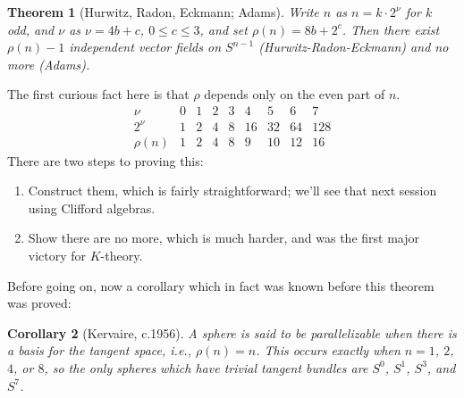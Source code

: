 \documentclass{article}
\newtheorem{thm}{Theorem}[section]
\newtheorem{cor}[thm]{Corollary}
\theoremstyle{definition}
\begin{document}
\begin{thm}[Hurwitz, Radon, Eckmann; Adams]
Write $n$ as $n = k \cdot 2^\nu$ for $k$ odd, and $\nu$ as $\nu = 4b + c$, $0 \le c \le 3$, and set $\rho(n) = 8b + 2^c$.  Then there exist $\rho(n) - 1$ independent vector fields on $S^{n-1}$ (Hurwitz-Radon-Eckmann) and no more (Adams).
\end{thm}
The first curious fact here is that $\rho$ depends only on the even part of $n$.
\[\begin{array}{c|cccccccc}
\nu & 0 & 1 & 2 & 3 & 4 & 5 & 6 & 7 \\
2^\nu & 1 & 2 & 4 & 8 & 16 & 32 & 64 & 128 \\
\hline
\rho(n) & 1 & 2 & 4 & 8 & 9 & 10 & 12 & 16
\end{array}\]
There are two steps to proving this:
\begin{enumerate} %
\item Construct them, which is fairly straightforward; we'll see that next session using Clifford algebras.
\item Show there are no more, which is much harder, and was the first major victory for $K$-theory.
\end{enumerate}
Before going on, now a corollary which in fact was known before this theorem was proved:
\begin{cor}[Kervaire, c.1956]
A sphere is said to be parallelizable when there is a basis for the tangent space, i.e., $\rho(n) = n$.  This occurs exactly when $n = 1$, $2$, $4$, or $8$, so the only spheres which have trivial tangent bundles are $S^0$, $S^1$, $S^3$, and $S^7$.
\end{cor}
\end{document}
